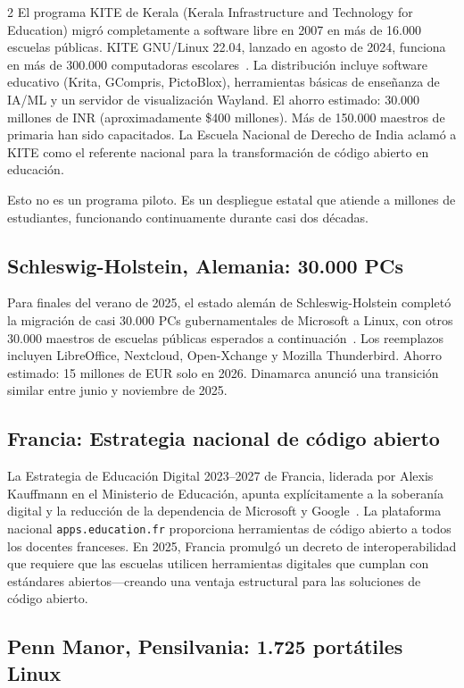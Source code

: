 \documentclass[11pt, a4paper]{article}
\begin{document}
\begin{multicols}{2}
El programa KITE de Kerala (Kerala Infrastructure and Technology for Education) migró completamente a software libre en 2007 en más de 16.000 escuelas públicas. KITE GNU/Linux 22.04, lanzado en agosto de 2024, funciona en más de 300.000 computadoras escolares~\citep{kite2024gnulinux}. La distribución incluye software educativo (Krita, GCompris, PictoBlox), herramientas básicas de enseñanza de IA/ML y un servidor de visualización Wayland. El ahorro estimado: 30.000 millones de INR (aproximadamente \$400 millones). Más de 150.000 maestros de primaria han sido capacitados. La Escuela Nacional de Derecho de India aclamó a KITE como el referente nacional para la transformación de código abierto en educación.

Esto no es un programa piloto. Es un despliegue estatal que atiende a millones de estudiantes, funcionando continuamente durante casi dos décadas.

\subsection{Schleswig-Holstein, Alemania: 30.000 PCs}

Para finales del verano de 2025, el estado alemán de Schleswig-Holstein completó la migración de casi 30.000 PCs gubernamentales de Microsoft a Linux, con otros 30.000 maestros de escuelas públicas esperados a continuación~\citep{schleswig2025linux}. Los reemplazos incluyen LibreOffice, Nextcloud, Open-Xchange y Mozilla Thunderbird. Ahorro estimado: 15 millones de EUR solo en 2026. Dinamarca anunció una transición similar entre junio y noviembre de 2025.

\subsection{Francia: Estrategia nacional de código abierto}

La Estrategia de Educación Digital 2023--2027 de Francia, liderada por Alexis Kauffmann en el Ministerio de Educación, apunta explícitamente a la soberanía digital y la reducción de la dependencia de Microsoft y Google~\citep{france2023digital}. La plataforma nacional \texttt{apps.education.fr} proporciona herramientas de código abierto a todos los docentes franceses. En 2025, Francia promulgó un decreto de interoperabilidad que requiere que las escuelas utilicen herramientas digitales que cumplan con estándares abiertos---creando una ventaja estructural para las soluciones de código abierto.

\subsection{Penn Manor, Pensilvania: 1.725 portátiles Linux}


\end{multicols}
\end{document}
